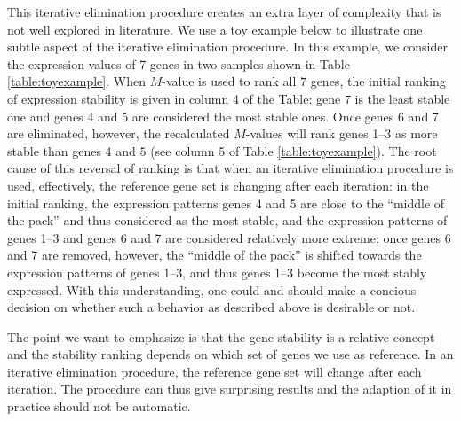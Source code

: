 \documentclass[11pt, a4paper]{article}
\begin{document}
This iterative elimination procedure creates an extra layer of complexity that
is not well explored in literature. We use a toy example below to illustrate
one subtle aspect of the iterative elimination procedure.  In this example, we
consider the expression values of 7 genes in two samples shown in Table
\ref{table:toyexample}. When $M$-value is used to rank all $7$ genes, the
initial ranking of expression stability is given in column 4 of the Table:
gene $7$ is the least stable one and genes $4$ and $5$ are considered the most
stable ones.  Once genes 6 and 7 are eliminated, however, the recalculated
$M$-values will rank genes 1--3 as more stable than genes $4$ and
$5$ (see column 5 of Table \ref{table:toyexample}). The root cause of this
reversal of ranking is that when an iterative elimination procedure is used,
effectively, the reference gene set is changing after each iteration: in the
initial ranking, the expression patterns genes 4 and 5 are close to the
``middle of the pack'' and thus considered as the most stable, and the
expression patterns of genes 1--3 and genes 6 and 7 are considered relatively
more extreme; once genes 6 and 7 are removed, however, the ``middle of the
pack'' is shifted towards the expression patterns of genes 1--3, and thus
genes 1--3 become the most stably expressed.  With this understanding, one
could and should make a concious decision on whether such a behavior as
described above is desirable or not.  

The point we want to emphasize is that the gene stability is a relative concept
and the stability ranking depends on which set of genes we use as reference.
In an iterative elimination procedure, the reference gene set will change
after each iteration. The procedure can thus give surprising results and the
adaption of it in practice should not be automatic.
\end{document}
